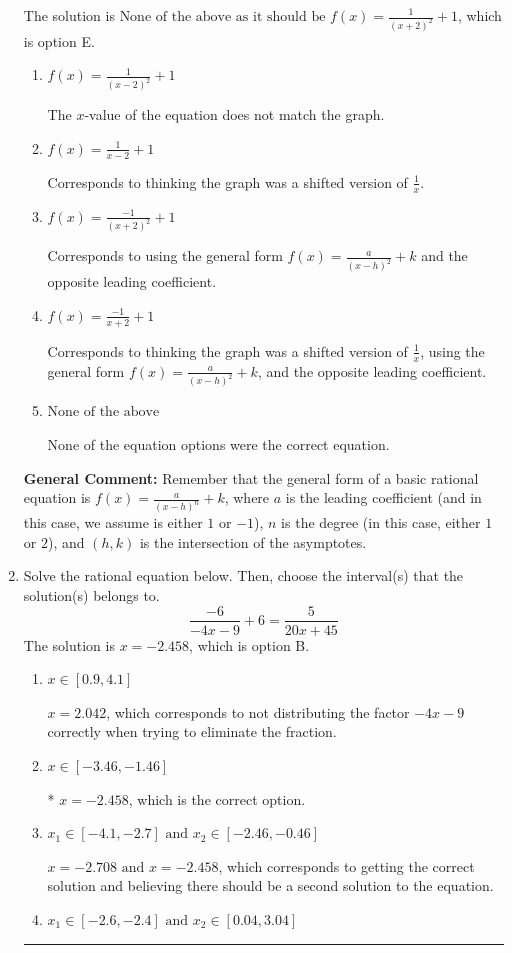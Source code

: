 \documentclass{extbook}[14pt]
\newcommand{\litem}[1]{\item #1

\rule{\textwidth}{0.4pt}}
\begin{document}
\begin{enumerate}
{The solution is \( \text{None of the above as it should be } f(x) = \frac{1}{(x + 2)^2} + 1 \), which is option E.\begin{enumerate}[label=\Alph*.]
\item \( f(x) = \frac{1}{(x - 2)^2} + 1 \)

The $x$-value of the equation does not match the graph.
\item \( f(x) = \frac{1}{x - 2} + 1 \)

Corresponds to thinking the graph was a shifted version of $\frac{1}{x}$.
\item \( f(x) = \frac{-1}{(x + 2)^2} + 1 \)

Corresponds to using the general form $f(x) = \frac{a}{(x-h)^2}+k$ and the opposite leading coefficient.
\item \( f(x) = \frac{-1}{x + 2} + 1 \)

Corresponds to thinking the graph was a shifted version of $\frac{1}{x}$, using the general form $f(x) = \frac{a}{(x-h)^2}+k$, and the opposite leading coefficient.
\item \( \text{None of the above} \)

None of the equation options were the correct equation.
\end{enumerate}

\textbf{General Comment:} Remember that the general form of a basic rational equation is $ f(x) = \frac{a}{(x-h)^n} + k$, where $a$ is the leading coefficient (and in this case, we assume is either $1$ or $-1$), $n$ is the degree (in this case, either $1$ or $2$), and $(h, k)$ is the intersection of the asymptotes.
}
\litem{
Solve the rational equation below. Then, choose the interval(s) that the solution(s) belongs to.
\[ \frac{-6}{-4x -9} + 6 = \frac{5}{20x + 45} \]The solution is \( x = -2.458 \), which is option B.\begin{enumerate}[label=\Alph*.]
\item \( x \in [0.9,4.1] \)

$x = 2.042$, which corresponds to not distributing the factor $-4x -9$ correctly when trying to eliminate the fraction.
\item \( x \in [-3.46,-1.46] \)

* $x = -2.458$, which is the correct option.
\item \( x_1 \in [-4.1, -2.7] \text{ and } x_2 \in [-2.46,-0.46] \)

$x = -2.708 \text{ and } x = -2.458$, which corresponds to getting the correct solution and believing there should be a second solution to the equation.
\item \( x_1 \in [-2.6, -2.4] \text{ and } x_2 \in [0.04,3.04] \)


\end{enumerate}}
\end{enumerate}
\end{document}
